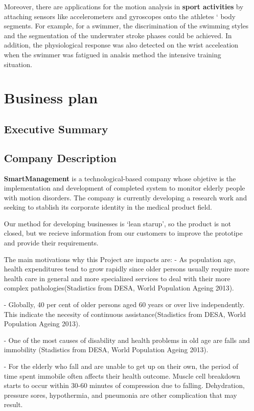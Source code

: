 Moreover, there are applications for the motion analysis in \textbf{sport activities} by attaching sensors like accelerometers and gyroscopes onto the athletes ‘  body segments. For example, for a swimmer, the discrimination of the swimming styles and the segmentation of the underwater stroke phases could be achieved. In addition, the physiological response was also detected on the wrist acceleation when the swimmer was fatigued in analsis method the intensive training situation\cite{Yuji}.



\section{Business plan }
\subsection{Executive Summary}

\subsection{Company Description}
\textbf{SmartManagement} is a technological-based company whose objetive is the implementation and development of completed system to monitor elderly people with motion disorders. The company is currently developing a research work and seeking to stablish its corporate identity in the medical product field.

Our method for developing businesses is ‘lean starup’, so the product is not closed, but we recieve information from our customers to improve the prototipe and provide their requirements.

The main motivations why this Project are impacts are:
-	As population age, health expenditures tend to grow rapidly since older persons usually require more health care in general and more specialized services to deal with their more complex pathologies(Stadistics from DESA,  World Population Ageing 2013\cite{desa}).

-	Globally, 40 per cent of older persons aged 60 years or over live independently. This indicate the necesity of continuous assistance(Stadistics from DESA,  World Population Ageing 2013\cite{desa}).

-	One of the most causes of disability and health problems in old age are falls and immobility (Stadistics from DESA,  World Population Ageing 2013\cite{desa}).

-	For the elderly who fall and are unable to get up on their own, the period of time spent immobile often affects their health outcome. Muscle cell breakdown starts to occur within 30-60 minutes of compression due to falling. Dehydration, pressure sores, hypothermia, and pneumonia are other complication that may result\cite{A.Olivares2013}.

